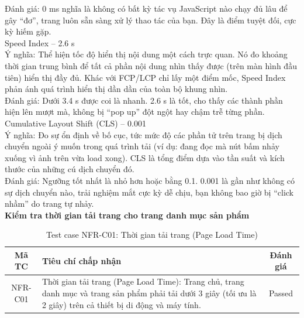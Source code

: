 Đánh giá: 0 ms nghĩa là không có bất kỳ tác vụ JavaScript nào chạy đủ lâu để gây “đơ”, trang luôn sẵn sàng xử lý thao tác của bạn. Đây là điểm tuyệt đối, cực kỳ hiếm gặp. \\

Speed Index – 2.6 s \\
Ý nghĩa: Thể hiện tốc độ hiển thị nội dung một cách trực quan. Nó đo khoảng thời gian trung bình để tất cả phần nội dung nhìn thấy được (trên màn hình đầu tiên) hiển thị đầy đủ. Khác với FCP/LCP chỉ lấy một điểm mốc, Speed Index phản ánh quá trình hiển thị dần dần của toàn bộ khung nhìn. \\

Đánh giá: Dưới 3.4 s được coi là nhanh. 2.6 s là tốt, cho thấy các thành phần hiện lên mượt mà, không bị “pop up” đột ngột hay chậm trễ từng phần. \\

Cumulative Layout Shift (CLS) – 0.001 \\
Ý nghĩa: Đo sự ổn định về bố cục, tức mức độ các phần tử trên trang bị dịch chuyển ngoài ý muốn trong quá trình tải (ví dụ: đang đọc mà nút bấm nhảy xuống vì ảnh trên vừa load xong). CLS là tổng điểm dựa vào tần suất và kích thước của những cú dịch chuyển đó. \\

Đánh giá: Ngưỡng tốt nhất là nhỏ hơn hoặc bằng 0.1. 0.001 là gần như không có sự dịch chuyển nào, trải nghiệm mắt cực kỳ dễ chịu, bạn không bao giờ bị “click nhầm” do trang tự nhảy. \\

\newpage
\vspace{0.3cm}
\noindent\textbf{Kiểm tra thời gian tải trang cho trang danh mục sản phẩm}
\begin{table}[H]
  \centering
  \renewcommand{\arraystretch}{1.3}
  \begin{tabular}{|c|p{8.3cm}|c|}
    \hline
    \textbf{Mã TC} & \textbf{Tiêu chí chấp nhận}                                                                                                                                     & \textbf{Đánh giá} \\
    \hline
    NFR-C01        & Thời gian tải trang (Page Load Time): Trang chủ, trang danh mục và trang sản phẩm phải tải dưới 3 giây (tối ưu là 2 giây) trên cả thiết bị di động và máy tính. & Passed            \\
    \hline
  \end{tabular}
  \caption{Test case NFR-C01: Thời gian tải trang (Page Load Time)}
\end{table}

